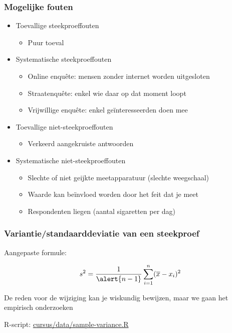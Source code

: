 \documentclass{beamer}
\begin{document}
\begin{frame}
  \frametitle{Mogelijke fouten}

  \begin{itemize}
    \item<+-> Toevallige steekproeffouten
      \begin{itemize}
        \item Puur toeval
      \end{itemize}
    \item<+-> Systematische steekproeffouten
      \begin{itemize}
        \item Online enquête: mensen zonder internet worden uitgesloten
        \item Straatenquête: enkel wie daar op dat moment loopt
        \item Vrijwillige enquête: enkel geïnteresseerden doen mee
      \end{itemize}
    \item<+-> Toevallige niet-steekproeffouten
      \begin{itemize}
        \item Verkeerd aangekruiste antwoorden
      \end{itemize}
    \item<+-> Systematische niet-steekproeffouten
      \begin{itemize}
        \item Slechte of niet geijkte meetapparatuur (slechte weegschaal)
        \item Waarde kan beïnvloed worden door het feit dat je meet
        \item Respondenten liegen (aantal sigaretten per dag)
      \end{itemize}
  \end{itemize}
\end{frame}

\begin{frame}
  \frametitle{Variantie/standaarddeviatie van een steekproef}

  \begin{center}
    Aangepaste formule:
    
    \begin{equation*}
    s^2 = \frac{1}{\alert{n-1}} \sum_{i=1}^{n} (\overline{x} - x_i)^2
    \end{equation*}
    
    De reden voor de wijziging kan je wiskundig bewijzen, maar we gaan het empirisch onderzoeken

    \vfill

    R-script: \href{https://github.com/HoGentTIN/onderzoekstechnieken-cursus/blob/master/cursus/data/sample-variance.R}{cursus/data/sample-variance.R}
  \end{center}
\end{frame}
\end{document}

